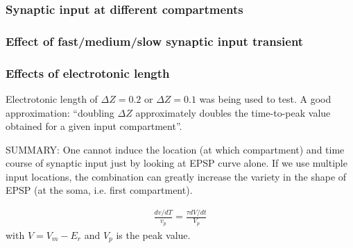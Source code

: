 
\subsubsection{Synaptic input at different compartments}
\label{sec:synaptic-input-at}


\subsubsection{Effect of fast/medium/slow synaptic input transient}
\label{sec:effect-fastm-synapt}


\subsubsection{Effects of electrotonic length}
\label{sec:effects-electr-lengt}

Electrotonic length of $\Delta Z = 0.2$ or $\Delta Z = 0.1$ was being
used to test. A good approximation: ``doubling $\Delta Z$
approximately doubles the time-to-peak value obtained for a given
input compartment''. 

SUMMARY: One cannot induce the location (at which compartment) and
time course of synaptic input just by looking at EPSP curve alone. If
we use multiple input locations, the combination can greatly increase
the variety in the shape of EPSP (at the soma, i.e. first
compartment).


\begin{eqnarray}
  \label{eq:532}
  \frac{dv/dT}{v_p} = \frac{\tau dV/dt}{V_p}
\end{eqnarray}
with $V=V_m-E_r$ and $V_p$ is the peak value.


